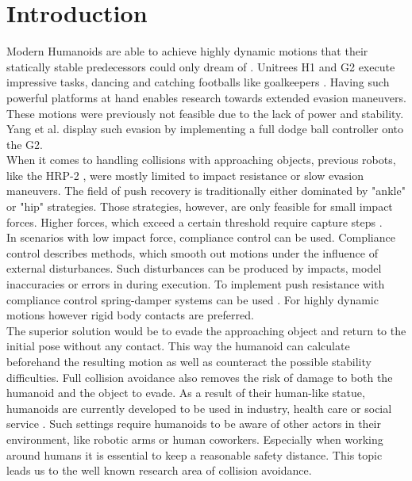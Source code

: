 \section{Introduction} \label{sec:introduction}

Modern Humanoids are able to achieve highly dynamic motions that their statically stable predecessors could only dream of \cite{tong_2024}.
Unitrees H1 and G2 execute impressive tasks, dancing \cite{sun_2026} and catching footballs like goalkeepers \cite{ren_2026}.
Having such powerful platforms at hand enables research towards extended evasion maneuvers.
These motions were previously not feasible due to the lack of power and stability.
Yang et al. \cite{yang_2026} display such evasion by implementing a full dodge ball controller onto the G2.
\\
When it comes to handling collisions with approaching objects, previous robots, like the HRP-2 \cite{kaneko_2004}, were mostly limited to impact resistance or slow evasion maneuvers.
The field of push recovery is traditionally either dominated by "ankle" or "hip" strategies.
Those strategies, however, are only feasible for small impact forces.
Higher forces, which exceed a certain threshold require capture steps \cite{pratt_2006}.
\\
In scenarios with low impact force, compliance control can be used.
Compliance control describes methods, which smooth out motions under the influence of external disturbances.
Such disturbances can be produced by impacts, model inaccuracies or errors in during execution.
To implement push resistance with compliance control spring-damper systems can be used \cite{huang_2022}. 
For highly dynamic motions however rigid body contacts are preferred.
\\
The superior solution would be to evade the approaching object and return to the initial pose without any contact.
This way the humanoid can calculate beforehand the resulting motion as well as counteract the possible stability difficulties.
Full collision avoidance also removes the risk of damage to both the humanoid and the object to evade.
As a result of their human-like statue, humanoids are currently developed to be used in industry, health care or social service \cite{tong_2024,mccartney_2020}.
Such settings require humanoids to be aware of other actors in their environment, like robotic arms or human coworkers.
Especially when working around humans it is essential to keep a reasonable safety distance.
This topic leads us to the well known research area of collision avoidance.

